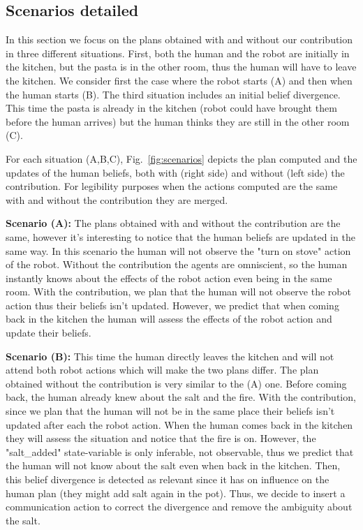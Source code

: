 \documentclass[letterpaper]{article} %
\begin{document}
\subsection{Scenarios detailed}

In this section we focus on the plans obtained with and without our contribution in three different situations. First, both the human and the robot are initially in the kitchen, but the pasta is in the other room, thus the human will have to leave the kitchen. We consider first the case where the robot starts (A) and then when the human starts (B). The third situation includes an initial belief divergence. This time the pasta is already in the kitchen (robot could have brought them before the human arrives) but the human thinks they are still in the other room (C).  

For each situation (A,B,C), Fig.~\ref{fig:scenarios} depicts the plan computed and the updates of the human beliefs, both with (right side) and without (left side) the contribution. For legibility purposes when the actions computed are the same with and without the contribution they are merged.

\textbf{Scenario (A):} The plans obtained with and without the contribution are the same, however it's interesting to notice that the human beliefs are updated in the same way. In this scenario the human will not observe the "turn on stove" action of the robot. Without the contribution the agents are omniscient, so the human instantly knows about the effects of the robot action even being in the same room. With the contribution, we plan that the human will not observe the robot action thus their beliefs isn't updated. However, we predict that when coming back in the kitchen the human will assess the effects of the robot action and update their beliefs.

\textbf{Scenario (B):} This time the human directly leaves the kitchen and will not attend both robot actions which will make the two plans differ. The plan obtained without the contribution is very similar to the (A) one. Before coming back, the human already knew about the salt and the fire. With the contribution, since we plan that the human will not be in the same place their beliefs isn't updated after each the robot action. When the human comes back in the kitchen they will assess the situation and notice that the fire is on. However, the "salt\_added" state-variable is only inferable, not observable, thus we predict that the human will not know about the salt even when back in the kitchen. Then, this belief divergence is detected as relevant since it has on influence on the human plan (they might add salt again in the pot). Thus, we decide to insert a communication action to correct the divergence and remove the ambiguity about the salt.
\end{document}
